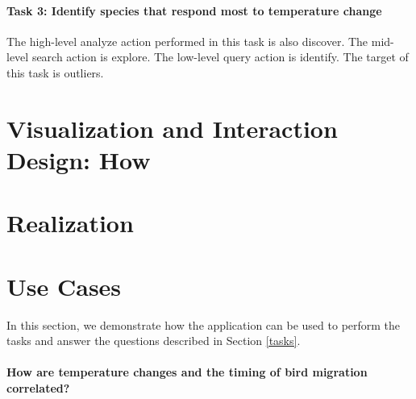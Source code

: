 \documentclass[journal]{vgtc}                %
\begin{document}
\paragraph{Task 3: Identify species that respond most to temperature change} The high-level analyze action performed in this task is also discover. The mid-level search action is explore. The low-level query action is identify. The target of this task is outliers.

\section{Visualization and Interaction Design: How}


\section{Realization}


\section{Use Cases}

In this section, we demonstrate how the application can be used to perform the tasks and answer the questions described in Section \ref{tasks}.

\paragraph{How are temperature changes and the timing of bird migration correlated?}
\end{document}
